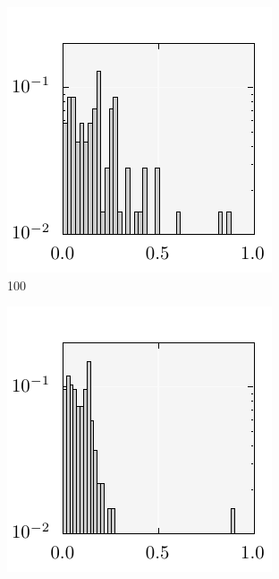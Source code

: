 \documentclass{stdlocal}
\begin{document}
    \begin{figure}[t]
      \center
      \begin{subfigure}[b]{0.24\textwidth}
        \center
        \includegraphics[width=\textwidth]{../../plots/kursawe_histogram_100.pdf}
        \caption{100}
      \end{subfigure}
      \begin{subfigure}[b]{0.24\textwidth}
        \center
        \includegraphics[width=\textwidth]{../../plots/kursawe_histogram_200.pdf}

\end{subfigure}
\end{figure}
\end{document}
